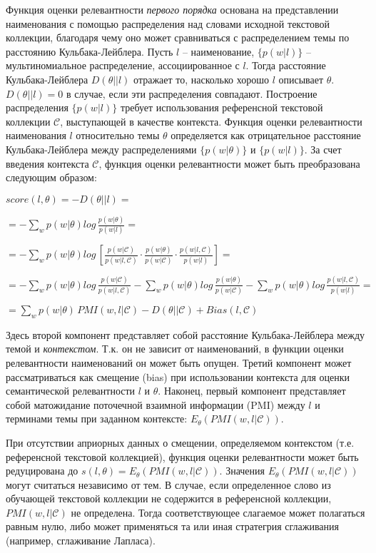 Функция оценки релевантности \textit{первого порядка} основана на представлении наименования с помощью распределения над словами исходной текстовой коллекции, благодаря чему оно может сравниваться с распределением темы по расстоянию Кульбака-Лейблера. Пусть $l$ -- наименование, $\{p(w|l)\}$ -- мультиномиальное распределение, ассоциированное с $l$. Тогда расстояние Кульбака-Лейблера $D(\theta||l)$ отражает то, насколько хорошо $l$ описывает $\theta$.  $D(\theta||l) = 0$ в случае, если эти распределения совпадают. Построение распределения $\{p(w|l)\}$ требует использования референсной текстовой коллекции $\mathcal{C}$, выступающей в качестве контекста. Функция оценки релевантности наименования $l$ относительно темы $\theta$ определяется как отрицательное расстояние Кульбака-Лейблера между распределениями $\{p(w|\theta)\}$ и $\{p(w|l)\}$. За счет введения контекста $\mathcal{C}$, функция оценки релевантности может быть преобразована следующим образом:

$score(l, \theta) = -D(\theta||l) =$

$= -\sum_{w}p(w|\theta)log\,\frac{p(w|\theta)}{p(w|l)} =$

$= -\sum_{w}p(w|\theta)log\,[\frac{p(w|\mathcal{C})}{p(w|l,\mathcal{C})}\cdot  \frac{p(w|\theta)}{p(w|\mathcal{C})}\cdot\frac{p(w|l,\mathcal{C})}{p(w|l)}] =$

$= -\sum_{w}p(w|\theta)log\,\frac{p(w|\mathcal{C})}{p(w|l,\mathcal{C})} -\sum_{w}p(w|\theta)log\,\frac{p(w|\theta)}{p(w|\mathcal{C})} -\sum_{w}p(w|\theta)log\,\frac{p(w|l,\mathcal{C})}{p(w|l)} =$

$= \sum_{w}p(w|\theta)\,PMI(w,l|\mathcal{C}) - D(\theta||\mathcal{C}) + Bias(l, \mathcal{C})$

Здесь второй компонент представляет собой расстояние Кульбака-Лейблера между темой и \textit{контекстом}. Т.к. он не зависит от наименований, в функции оценки релевантности наименований он может быть опущен. Третий компонент может рассматриваться как смещение (bias) при использовании контекста для оценки семантической релевантности $l$ и $\theta$. Наконец, первый компонент представляет собой матожидание поточечной взаимной информации (PMI) между $l$ и терминами темы при заданном контексте: $E_\theta(PMI(w,l|\mathcal{C}))$.

При отсутствии априорных данных о смещении, определяемом контекстом (т.е. референсной текстовой коллекцией), функция оценки релевантности может быть редуцирована до $s(l,\theta) = E_\theta(PMI(w,l|\mathcal{C}))$. Значения $E_\theta(PMI(w,l|\mathcal{C}))$ могут считаться независимо от тем. В случае, если определенное слово из обучающей текстовой коллекции не содержится в референсной коллекции, $PMI(w,l|\mathcal{C})$ не определена. Тогда соответствующее слагаемое может полагаться равным нулю, либо может применяться та или иная стратегрия сглаживания (например, сглаживание Лапласа). 

